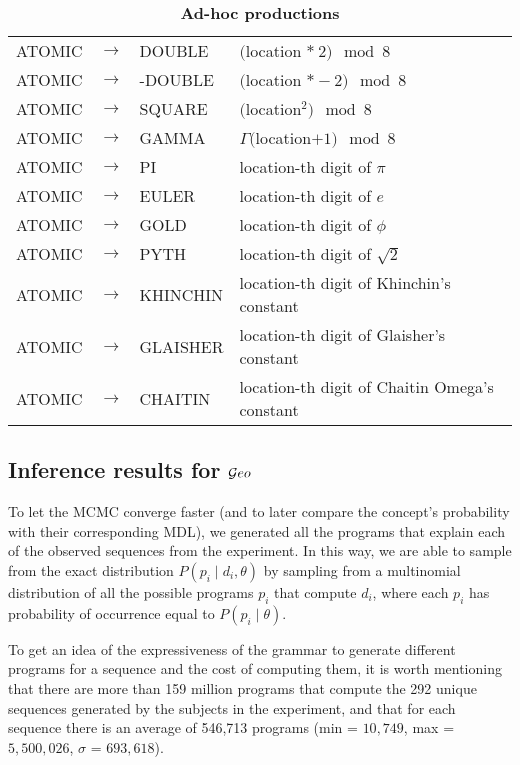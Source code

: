 \begin{table}[!ht]
\centering
\caption{{\bf Ad-hoc productions}}
\label{table:adhoc}
\begin{tabular}{lll|l}
\thickhline
ATOMIC  & $\rightarrow$ & DOUBLE & $($location $*\ 2) \mod 8$  \\
ATOMIC  & $\rightarrow$ & -DOUBLE & $($location $* -2) \mod 8$ \\
ATOMIC  & $\rightarrow$ & SQUARE & $($location$^2) \mod 8$ \\
ATOMIC  & $\rightarrow$ & GAMMA & $\Gamma($location$+1) \mod 8$ \\
ATOMIC  & $\rightarrow$ & PI & location-th digit of $\pi$ \\
ATOMIC  & $\rightarrow$ & EULER & location-th digit of $e$ \\
ATOMIC  & $\rightarrow$ & GOLD & location-th digit of $\phi$ \\
ATOMIC  & $\rightarrow$ & PYTH & location-th digit of $\sqrt{2}$ \\
ATOMIC  & $\rightarrow$ & KHINCHIN & location-th digit of Khinchin's constant \\
ATOMIC  & $\rightarrow$ & GLAISHER &  location-th digit of Glaisher's constant \\
ATOMIC  & $\rightarrow$ & CHAITIN & location-th digit of Chaitin Omega's constant \\
\hline
\end{tabular}
\end{table}

\subsection{Inference results for $\mathcal Geo$}

To let the MCMC converge faster (and to later compare the concept's probability with their corresponding MDL), we generated all the programs that explain each of the observed sequences from the experiment. In this way, we are able to sample from the exact distribution $P(p_i \mid d_i, \theta)$ by sampling from a multinomial distribution of all the possible programs $p_i$ that compute $d_i$, where each $p_i$ has probability of occurrence equal to $P(p_i \mid \theta)$.

To get an idea of the expressiveness of the grammar to generate different programs for a sequence and the cost of computing them, it is worth mentioning that there are more than 159 million programs that compute the 292 unique sequences generated by the subjects in the experiment, and that for each sequence there is an average of 546,713 programs (min = $10,749$, max = $5,500,026$, $\sigma$ = $693,618$).


